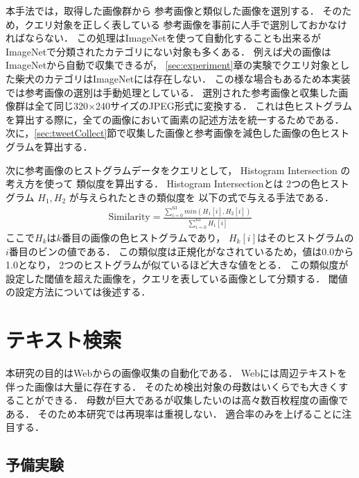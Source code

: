 本手法では，取得した画像群から
参考画像と類似した画像を選別する．
そのため，クエリ対象を正しく表している
参考画像を事前に人手で選別しておかなければならない．
この処理はImageNetを使って自動化することも出来るが
ImageNetで分類されたカテゴリにない対象も多くある．
例えば犬の画像はImageNetから自動で収集できるが，
\ref{sec:experiment}章の実験でクエリ対象とした柴犬のカテゴリはImageNetには存在しない．
この様な場合もあるため本実装では参考画像の選別は手動処理としている．
%
選別された参考画像と収集した画像群は全て同じ320$\times$240サイズのJPEG形式に変換する．
これは色ヒストグラムを算出する際に，全ての画像において画素の記述方法を統一するためである．
次に，\ref{sec:tweetCollect}節で収集した画像と参考画像を減色した画像の色ヒストグラムを算出する．

次に参考画像のヒストグラムデータをクエリとして，
Histogram Intersection
の考え方を使って
類似度を算出する．
Histogram Intersectionとは
2つの色ヒストグラム
$H_1,H_2$
が与えられたときの類似度を
以下の式で与える手法である．
%
\begin{eqnarray}
\mbox{Similarity} = \frac{\sum_{i=0}^{63} min(H_1[i],H_2[i])}{\sum_{i=0}^{63} H_1[i]}
\end{eqnarray}
%
ここで$H_k$は$k$番目の画像の色ヒストグラムであり，
$H_k[i]$はそのヒストグラムの$i$番目のビンの値である．
この類似度は正規化がなされているため，値は0.0から1.0となり，
2つのヒストグラムが似ているほど大きな値をとる．
この類似度が設定した閾値を超えた画像を，クエリを表している画像として分類する．
閾値の設定方法については後述する．


\section{テキスト検索}
\label{sec:textSearch}

本研究の目的はWebからの画像収集の自動化である．
Webには周辺テキストを伴った画像は大量に存在する．
そのため検出対象の母数はいくらでも大きくすることができる．
母数が巨大であるが収集したいのは高々数百枚程度の画像である．
そのため本研究では再現率は重視しない．
適合率のみを上げることに注目する．

\subsection{予備実験}
\label{sec:yobijikken}

